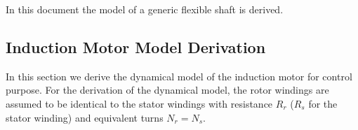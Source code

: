 \documentclass[11pt,a4paper]{scrartcl}
\title{\textbf{ 
		\begin{LARGE}
			Extended Kalman Filter:
		\end{LARGE} \\[24pt]
		\begin{Large}
	Application to IM with Ttype MPC Three Phase Inverter.
	\end{Large}}
}
\author{\textbf{Davide Bagnara}}
\numberwithin{equation}{section}
\theoremstyle{it}
\theoremstyle{definition}
\begin{document}
	\thispagestyle{firstpage}
	\begin{mybox}
		\maketitle
		\vspace{125mm}
	\end{mybox}
	\newpage
	\tableofcontents
	\listoffigures	
	\listoftables
	\newpage
	
	{In this document the model of a generic flexible shaft is derived.}

\begin{onehalfspace}
\section{Induction Motor Model Derivation}
In this section we derive the dynamical model of the induction motor for 
control purpose. For the derivation of the dynamical model, the rotor windings 
are assumed to be identical to the stator windings with resistance $R_r$ ($R_s$ 
for the stator winding) and equivalent turns $N_r=N_s$.


\end{onehalfspace}
\end{document}
